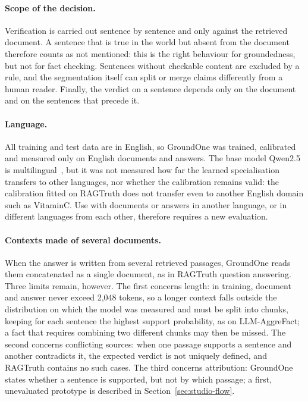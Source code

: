 \paragraph{Scope of the decision.} Verification is carried out sentence by sentence and only against the retrieved
document. A sentence that is true in the world but absent from the document therefore counts as not mentioned: this is
the right behaviour for groundedness, but not for fact checking. Sentences without checkable content are excluded by a
rule, and the segmentation itself can split or merge claims differently from a human reader. Finally, the verdict on a
sentence depends only on the document and on the sentences that precede it.

\paragraph{Language.} All training and test data are in English, so GroundOne was trained, calibrated and measured only on
English documents and answers. The base model Qwen2.5 is multilingual~\cite{qwen2024qwen25}, but it was not measured how
far the learned specialisation transfers to other languages, nor whether the calibration remains valid: the calibration
fitted on RAGTruth does not transfer even to another English domain such as VitaminC. Use with documents or answers in
another language, or in different languages from each other, therefore requires a new evaluation.

\paragraph{Contexts made of several documents.} When the answer is written from several retrieved passages, GroundOne
reads them concatenated as a single document, as in RAGTruth question answering. Three limits remain, however. The first
concerns length: in training, document and answer never exceed 2{,}048 tokens, so a longer context falls outside the
distribution on which the model was measured and must be split into chunks, keeping for each sentence the highest
support probability, as on LLM-AggreFact; a fact that requires combining two different chunks may then be missed. The
second concerns conflicting sources: when one passage supports a sentence and another contradicts it, the expected
verdict is not uniquely defined, and RAGTruth contains no such cases. The third concerns attribution: GroundOne states
whether a sentence is supported, but not by which passage; a first, unevaluated prototype is described in
Section~\ref{sec:studio-flow}.

